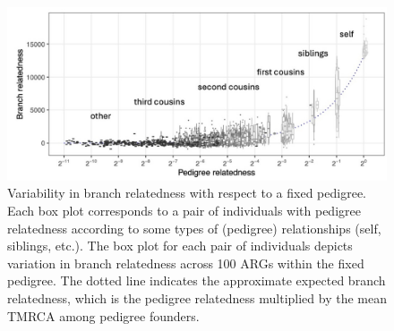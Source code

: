 \begin{figure}
    \centering
    \includegraphics[width=\textwidth]{Figures/Fig5_branch_recap_sim_boxplot_combined_behind2.jpg}
    \caption{Variability in branch relatedness with respect to a fixed pedigree.
    Each box plot corresponds to a pair of individuals with pedigree relatedness
    according to some types of (pedigree) relationships (self, siblings, etc.).
    The box plot for each pair of individuals depicts variation in branch relatedness across 100 ARGs within the fixed pedigree.
    The dotted line indicates the approximate expected branch relatedness,
    which is the pedigree relatedness multiplied by the mean TMRCA among pedigree founders.}
    \label{fig:boxplots}
\end{figure}
